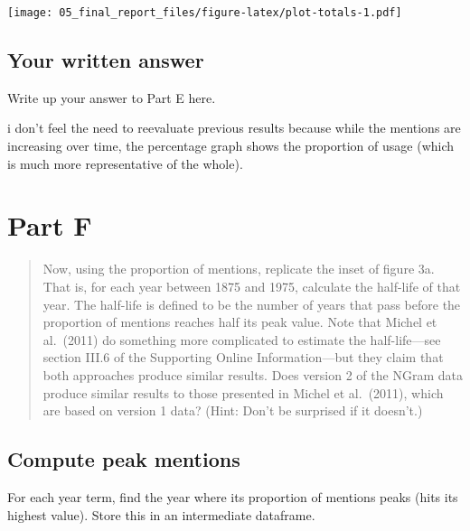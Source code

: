\documentclass[
]{article}
\begin{document}
\texttt{[image: 05\_final\_report\_files/figure-latex/plot-totals-1.pdf]}

\hypertarget{your-written-answer-3}{%
\subsection{Your written answer}\label{your-written-answer-3}}

Write up your answer to Part E here.

i don't feel the need to reevaluate previous results because while the
mentions are increasing over time, the percentage graph shows the
proportion of usage (which is much more representative of the whole).

\hypertarget{part-f}{%
\section{Part F}\label{part-f}}

\begin{quote}
Now, using the proportion of mentions, replicate the inset of figure 3a.
That is, for each year between 1875 and 1975, calculate the half-life of
that year. The half-life is defined to be the number of years that pass
before the proportion of mentions reaches half its peak value. Note that
Michel et al.~(2011) do something more complicated to estimate the
half-life---see section III.6 of the Supporting Online Information---but
they claim that both approaches produce similar results. Does version 2
of the NGram data produce similar results to those presented in Michel
et al.~(2011), which are based on version 1 data? (Hint: Don't be
surprised if it doesn't.)
\end{quote}

\hypertarget{compute-peak-mentions}{%
\subsection{Compute peak mentions}\label{compute-peak-mentions}}

For each year term, find the year where its proportion of mentions peaks
(hits its highest value). Store this in an intermediate dataframe.
\end{document}
